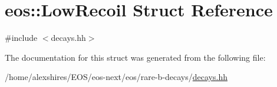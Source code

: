 \hypertarget{structeos_1_1LowRecoil}{
\section{eos::LowRecoil Struct Reference}
\label{structeos_1_1LowRecoil}
}


{\ttfamily \#include $<$decays.hh$>$}

The documentation for this struct was generated from the following file:\begin{DoxyCompactItemize}
\item 
/home/alexshires/EOS/eos-\/next/eos/rare-\/b-\/decays/\hyperlink{decays_8hh}{decays.hh}\end{DoxyCompactItemize}
